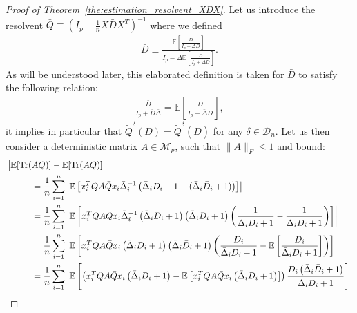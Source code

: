 \documentclass[a4papaer, titlepage]{book}
\begin{document}
\begin{proof}[Proof of Theorem~\ref{the:estimation_resolvent_XDX}]
Let us introduce the resolvent $\bar Q \equiv (I_p - \frac{1}{n}X \bar D X^T)^{-1}$ where we defined
\begin{align*}
  \bar D \equiv \frac{\mathbb E \left[ \frac{D}{I_p+\bar \Delta D} \right]}{I_p - \Delta \mathbb E \left[ \frac{D}{I_p+\bar \Delta D} \right]}.
\end{align*}
As will be understood later, this elaborated definition is taken for $\bar D$ to satisfy the following relation:
\begin{align*}
  \frac{\bar D}{I_p + \bar D \bar \Delta} = \mathbb E \left[ \frac{D}{I_p+\bar \Delta D} \right],
\end{align*}
it implies in particular that $\tilde Q^\delta(D) = \tilde Q^\delta(\bar D)$ for any $\delta \in \mathcal D_n$.
Let us then consider a deterministic matrix $A\in \mathcal M_{p}$, such that 
$\|A\|_F \leq 1$ and bound:
  \begin{align*}
    &\left\vert \mathbb E[\tr(AQ)] -\mathbb E[\tr(A\bar Q)]\right\vert\\
    &\hspace{1cm}= \frac{1}{n}\sum_{i=1}^n \left\vert \mathbb E \left[ x_i^T QA \bar Q x_i \bar \Delta_i^{-1}\left(\bar \Delta_i D_i + 1 - (\bar \Delta_i \bar D_i +1)\right)\right]\right\vert\\
    &\hspace{1cm}= \frac{1}{n}\sum_{i=1}^n \left\vert \mathbb E \left[ x_i^T QA \bar Q x_i \bar \Delta_i^{-1} \left( \bar \Delta_i D_i + 1 \right)\left( \bar \Delta_i \bar D_i + 1 \right)\left(\frac{1}{\bar \Delta_i \bar D_i +1} - \frac{1}{\bar \Delta_i D_i + 1} \right) \right]\right\vert\\
    &\hspace{1cm}= \frac{1}{n}\sum_{i=1}^n \left\vert \mathbb E \left[ x_i^T QA \bar Q x_i \left( \bar \Delta_i D_i + 1 \right)\left( \bar \Delta_i \bar D_i + 1 \right)\left(\frac{D_i}{\bar \Delta_i D_i + 1}  - \mathbb E \left[ \frac{D_i}{\bar \Delta_i D_i +1} \right]\right) \right]\right\vert\\
    &\hspace{1cm}= \frac{1}{n}\sum_{i=1}^n \left\vert \mathbb E \left[ \left( x_i^T QA \bar Q x_i \left( \bar \Delta_i D_i + 1 \right) - \mathbb E \left[ x_i^T QA \bar Q x_i \left( \bar \Delta_i D_i + 1 \right) \right] \right)\frac{D_i\left( \bar \Delta_i \bar D_i + 1 \right)}{\bar \Delta_i D_i + 1}  \right]\right\vert\\

\end{align*}
\end{proof}
\end{document}
